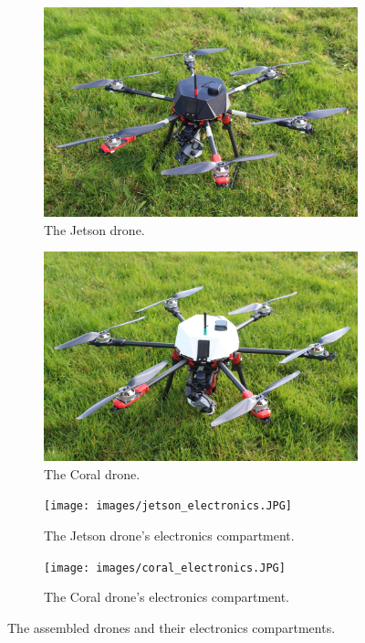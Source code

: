 \begin{figure}
    \begin{subfigure}[b]{0.48\textwidth}
        \centering
        \includegraphics[width=\textwidth]{images/jetson_drone.JPG}
        \caption{The Jetson drone.}
        \label{fig:jetson_drone}
    \end{subfigure}
    \begin{subfigure}[b]{0.48\textwidth}
        \centering
        \includegraphics[width=\textwidth]{images/coral_drone.JPG}
        \caption{The Coral drone.}
        \label{fig:coral_drone}
    \end{subfigure}

    \begin{subfigure}[b]{0.48\textwidth}
        \centering
        \texttt{[image: images/jetson\_electronics.JPG]}
        \caption{The Jetson drone's electronics compartment.}
        \label{fig:jetson_electronics}
    \end{subfigure}
    \begin{subfigure}[b]{0.48\textwidth}
        \centering
        \texttt{[image: images/coral\_electronics.JPG]}
        \caption{The Coral drone's electronics compartment.}
        \label{fig:coral_electronics}
    \end{subfigure}

    \caption{The assembled drones and their electronics compartments.}
    \label{figure:drone_pictures}
\end{figure}

